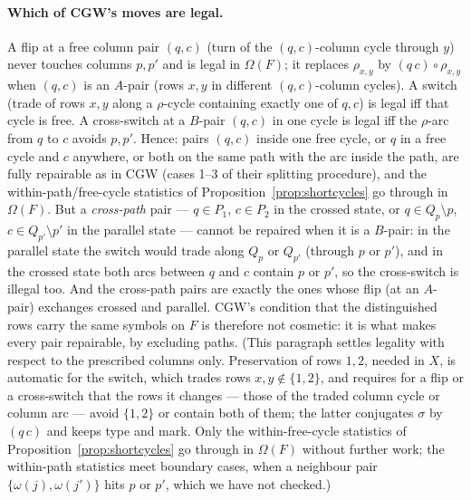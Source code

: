 \paragraph{Which of CGW's moves are legal.}  A flip at a free column
pair $(q,c)$ (turn of the $(q,c)$-column cycle through $y$) never
touches columns $p,p'$ and is legal in $\Omega(F)$; it replaces
$\rho_{x,y}$ by $(q\,c)\circ\rho_{x,y}$ when $(q,c)$ is an $A$-pair
(rows $x,y$ in different $(q,c)$-column cycles).  A switch (trade of
rows $x,y$ along a $\rho$-cycle containing exactly one of $q,c$) is
legal iff that cycle is free.  A cross-switch at a $B$-pair $(q,c)$ in
one cycle is legal iff the $\rho$-arc from $q$ to $c$ avoids $p,p'$.
Hence: pairs $(q,c)$ inside one free cycle, or $q$ in a free cycle and
$c$ anywhere, or both on the same path with the arc inside the path,
are fully repairable as in CGW (cases 1--3 of their splitting
procedure), and the within-path/free-cycle statistics of
Proposition~\ref{prop:shortcycles} go through in $\Omega(F)$.  But a
\emph{cross-path} pair --- $q\in P_1$, $c\in P_2$ in the crossed state,
or $q\in Q_p\setminus p$, $c\in Q_{p'}\setminus p'$ in the parallel
state --- cannot be repaired when it is a $B$-pair: in the parallel state the
switch would trade along $Q_p$ or $Q_{p'}$ (through $p$ or $p'$), and
in the crossed state both arcs between $q$ and $c$ contain $p$ or
$p'$, so the cross-switch is illegal too.  And the cross-path pairs
are exactly the ones whose flip (at an $A$-pair) exchanges crossed and
parallel.  CGW's condition that the distinguished rows carry the same
symbols on $F$ is therefore not cosmetic: it is what makes every pair
repairable, by excluding paths.  (This paragraph settles legality with
respect to the prescribed columns only.  Preservation of rows $1,2$,
needed in $X$, is automatic for the switch, which trades rows
$x,y\notin\{1,2\}$, and requires for a flip or a cross-switch that the
rows it changes --- those of the traded column cycle or column arc ---
avoid $\{1,2\}$ or contain both of them; the latter conjugates
$\sigma$ by $(q\,c)$ and keeps type and mark.  Only the
within-free-cycle statistics of Proposition~\ref{prop:shortcycles} go
through in $\Omega(F)$ without further work; the within-path
statistics meet boundary cases, when a neighbour pair
$\{\omega(j),\omega(j')\}$ hits $p$ or $p'$, which we have not
checked.)

